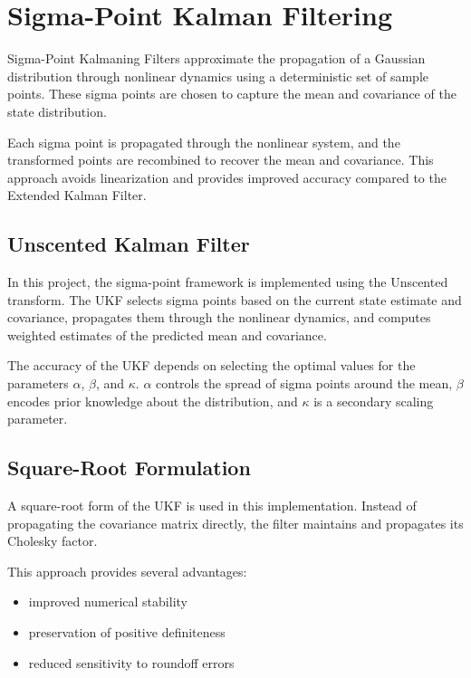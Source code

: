 \documentclass[11pt, letterpaper, twocolumn]{article}
\begin{document}
\section*{Sigma-Point Kalman Filtering}

Sigma-Point Kalmaning Filters approximate the propagation of a Gaussian distribution through
nonlinear dynamics using a deterministic set of sample points. These sigma points are chosen
to capture the mean and covariance of the state distribution.

Each sigma point is propagated through the nonlinear system, and the transformed points are 
recombined to recover the mean and covariance. This approach avoids linearization and provides
improved accuracy compared to the Extended Kalman Filter.

\subsection*{Unscented Kalman Filter}

In this project, the sigma-point framework is implemented using the Unscented transform. The UKF
selects sigma points based on the current state estimate and covariance, propagates them through
the nonlinear dynamics, and computes weighted estimates of the predicted mean and covariance.

The accuracy of the UKF depends on selecting the optimal values for the parameters $\alpha$,
$\beta$, and $\kappa$. $\alpha$ controls the spread of sigma points around the mean, $\beta$
encodes prior knowledge about the distribution, and $\kappa$ is a secondary scaling parameter.

\subsection*{Square-Root Formulation}

A square-root form of the UKF is used in this implementation. Instead of propagating the covariance
matrix directly, the filter maintains and propagates its Cholesky factor.

This approach provides several advantages:
\begin{itemize}
    \item improved numerical stability
    \item preservation of positive definiteness
    \item reduced sensitivity to roundoff errors
\end{itemize}
\end{document}
